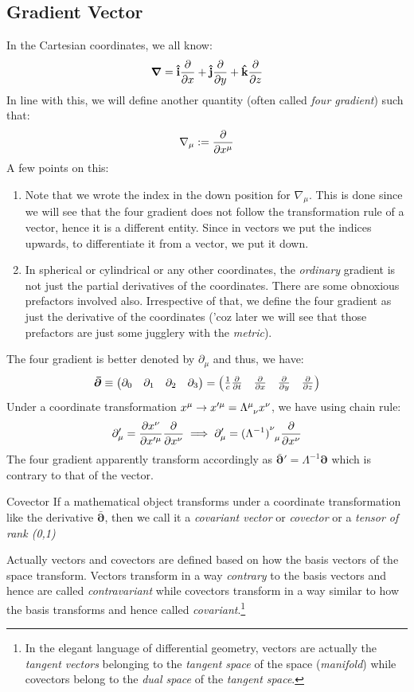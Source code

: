 \subsection{Gradient Vector}
In the Cartesian coordinates, we all know:
$$\grad = \vb{\hat{i}}\pdv{x}+\vb{\hat{j}}\pdv{y}+\vb{\hat{k}}\pdv{z} $$
In line with this, we will define another quantity (often called \textit{four gradient}) such that:
$$\nabla_\mu := \pdv{x^\mu}$$
A few points on this:
\begin{enumerate}
    \item Note that we wrote the index in the down position for $\nabla_\mu$. This is done since we will see that the four gradient does not follow the transformation rule of a vector, hence it is a different entity. Since in vectors we put the indices upwards, to differentiate it from a vector, we put it down. 
    \item In spherical or cylindrical or any other coordinates, the \textit{ordinary} gradient is not just the partial derivatives of the coordinates. There are some obnoxious prefactors involved also. Irrespective of that, we define the four gradient as just the derivative of the coordinates ('coz later we will see that those prefactors are just some jugglery with the \textit{metric}). 
\end{enumerate}
The four gradient is better denoted by $\partial_\mu$ and thus, we have:
$$\boldsymbol{\bar{\partial}} \equiv \begin{pmatrix}
    \partial_0 & \partial_1 & \partial_2 & \partial_3 
\end{pmatrix} = \begin{pmatrix}
    \frac{1}{c}\pdv{t} & \pdv{x} & \pdv{y} & \pdv{z}
\end{pmatrix}$$
Under a coordinate transformation $x^\mu \rightarrow x'^\mu = \tensor{\Lambda}{^\mu _\nu}x^\nu$, we have using chain rule:
$$\partial'_\mu = \pdv{x^\nu}{x'^\mu}\pdv{x^\nu} \implies \partial'_\mu= \tensor{{(\Lambda^{-1})}}{^\nu _\mu}\pdv{x^\nu}$$
The four gradient apparently transform accordingly as $\boldsymbol{\bar{\partial}}' = \Lambda^{-1}\boldsymbol{\partial}$ which is contrary to that of the vector. 
\begin{definition}{Covector}
    If a mathematical object transforms under a coordinate transformation like the derivative $\boldsymbol{\bar{\partial}}$, then we call it a \textit{covariant vector} or \textit{covector} or a \textit{tensor of rank (0,1)}
\end{definition}
Actually vectors and covectors are defined based on how the basis vectors of the space transform. Vectors transform in a way \textit{contrary} to the basis vectors and hence are called \textit{contravariant} while covectors transform in a way similar to how the basis transforms and hence called \textit{covariant}.\footnote{In the elegant language of differential geometry, vectors are actually the \textit{tangent vectors} belonging to the \textit{tangent space} of the space (\textit{manifold}) while covectors belong to the \textit{dual space} of the \textit{tangent space}.}
